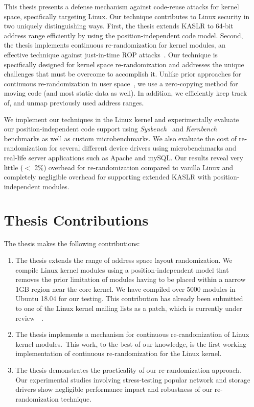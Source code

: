 This thesis presents a defense mechanism against code-reuse attacks for kernel space, specifically targeting Linux.
Our technique contributes to Linux security in two uniquely distinguishing ways. First, the thesis extends KASLR to 64-bit address range efficiently by using the position-independent code model. Second, the thesis implements continuous re-randomization for kernel modules, an effective technique against just-in-time ROP attacks~\cite{JITROP}. Our technique is specifically designed for kernel space re-randomization and addresses the unique challenges that must be overcome to accomplish it. Unlike prior approaches for continuous re-randomization in user space~\cite{SHUFFLER}, we use a zero-copying method for moving code (and most static data as well). In addition, we efficiently keep track of, and unmap previously used address ranges.

We implement our techniques in the Linux kernel and experimentally evaluate our position-independent code support using \textit{Sysbench}~\cite{web:sysbench} and \textit{Kernbench}~\cite{web:kernbench} benchmarks as well as custom microbenchmarks. We also evaluate the cost of re-randomization for several different device drivers using microbenchmarks and real-life server applications such as Apache and mySQL. Our results reveal very little ($<$ 2\%) overhead for re-randomization compared to vanilla Linux and completely negligible overhead for supporting extended KASLR with position-independent modules.

\section{Thesis Contributions}
The thesis makes the following contributions:
\begin{enumerate}
  \item The thesis extends the range of address space layout randomization. We compile Linux kernel modules using a position-independent model that removes the prior limitation of modules having to be placed within a narrow 1GB region near the core kernel. We have compiled over 5000 modules in Ubuntu 18.04 for our testing. This contribution has already been submitted to one of the Linux kernel mailing lists as a patch, which is currently under review~\ssrgContribution~\cite{pie_patch_2:online, pie_patch_1:online}.
  \item The thesis implements a mechanism for continuous re-randomization of Linux kernel modules.\ssrgEvolution~This work, to the best of our knowledge, is the first working implementation of continuous re-randomization for the Linux kernel.
  \item The thesis demonstrates the practicality of our re-randomization approach. Our experimental studies involving stress-testing popular network and storage drivers show negligible performance impact and robustness of our re-randomization technique.
\end{enumerate}

